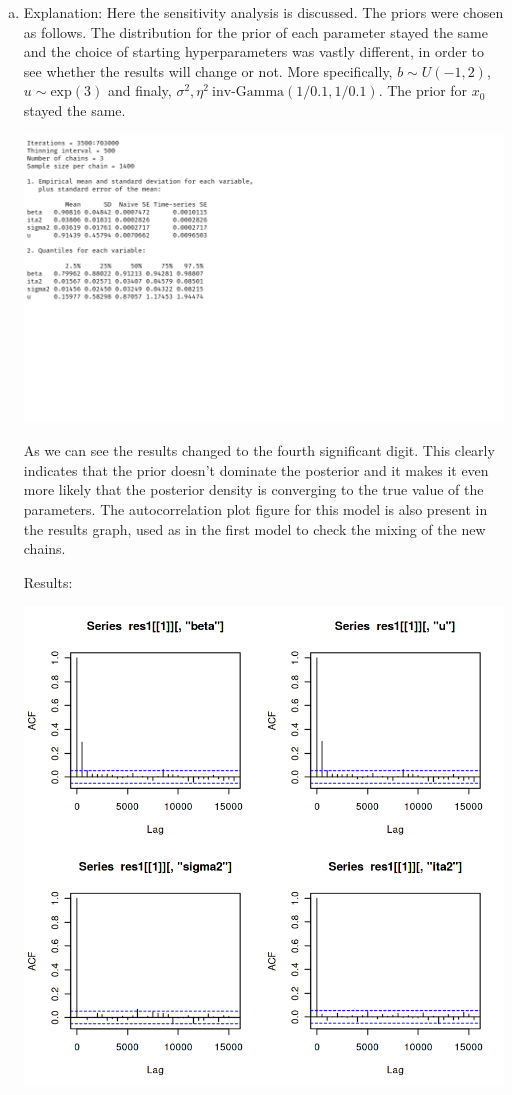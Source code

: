 \documentclass[12pt,a4paper]{article}
\begin{document}
\begin{enumerate}[(a)]
\item
Explanation: Here the sensitivity analysis is discussed. The priors were chosen as follows. The distribution for the prior of each parameter stayed the same and the choice of starting hyperparameters was vastly different, in order to see whether the results will change or not.
More specifically, $b \sim U(-1,2)$, $u \sim \text{exp}(3)$ and finaly, $\sigma^2, \eta^2 ~ \text{inv-Gamma}(1/0.1,1/0.1)$. The prior for $x_0$ stayed the same. 

\includegraphics[scale=0.25]{./images/1_table1.png}

As we can see the results changed to the fourth significant digit. This clearly indicates that the prior doesn't dominate the posterior and it makes it even more likely that the posterior density is converging to the true value of the parameters. The autocorrelation plot figure for this model is also present in the results graph, used as in the first model to check the mixing of the new chains.

Results:

\includegraphics[scale=0.30]{./images/1_Figure4_acf.png}


\end{enumerate}
\end{document}
